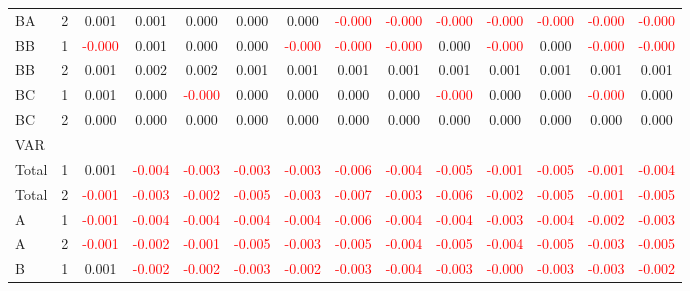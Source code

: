 \begin{table}[!htb]
{\begin{tabular}{llcccccccccccc}
BA & 2 & 0.001 & 0.001 & 0.000 & 0.000 & 0.000 & \textcolor{red}{-0.000} & \textcolor{red}{-0.000} & \textcolor{red}{-0.000} & \textcolor{red}{-0.000} & \textcolor{red}{-0.000} & \textcolor{red}{-0.000} & \textcolor{red}{-0.000}\\
BB & 1 & \textcolor{red}{-0.000} & 0.001 & 0.000 & 0.000 & \textcolor{red}{-0.000} & \textcolor{red}{-0.000} & \textcolor{red}{-0.000} & 0.000 & \textcolor{red}{-0.000} & 0.000 & \textcolor{red}{-0.000} & \textcolor{red}{-0.000}\\
BB & 2 & 0.001 & 0.002 & 0.002 & 0.001 & 0.001 & 0.001 & 0.001 & 0.001 & 0.001 & 0.001 & 0.001 & 0.001\\
BC & 1 & 0.001 & 0.000 & \textcolor{red}{-0.000} & 0.000 & 0.000 & 0.000 & 0.000 & \textcolor{red}{-0.000} & 0.000 & 0.000 & \textcolor{red}{-0.000} & 0.000\\
BC & 2 & 0.000 & 0.000 & 0.000 & 0.000 & 0.000 & 0.000 & 0.000 & 0.000 & 0.000 & 0.000 & 0.000 & 0.000\\
\hline
VAR &  &  &  &  &  &  &  &  &  &  &  &  & \\
\hline
Total & 1 & 0.001 & \textcolor{red}{-0.004} & \textcolor{red}{-0.003} & \textcolor{red}{-0.003} & \textcolor{red}{-0.003} & \textcolor{red}{-0.006} & \textcolor{red}{-0.004} & \textcolor{red}{-0.005} & \textcolor{red}{-0.001} & \textcolor{red}{-0.005} & \textcolor{red}{-0.001} & \textcolor{red}{-0.004}\\
Total & 2 & \textcolor{red}{-0.001} & \textcolor{red}{-0.003} & \textcolor{red}{-0.002} & \textcolor{red}{-0.005} & \textcolor{red}{-0.003} & \textcolor{red}{-0.007} & \textcolor{red}{-0.003} & \textcolor{red}{-0.006} & \textcolor{red}{-0.002} & \textcolor{red}{-0.005} & \textcolor{red}{-0.001} & \textcolor{red}{-0.005}\\
A & 1 & \textcolor{red}{-0.001} & \textcolor{red}{-0.004} & \textcolor{red}{-0.004} & \textcolor{red}{-0.004} & \textcolor{red}{-0.004} & \textcolor{red}{-0.006} & \textcolor{red}{-0.004} & \textcolor{red}{-0.004} & \textcolor{red}{-0.003} & \textcolor{red}{-0.004} & \textcolor{red}{-0.002} & \textcolor{red}{-0.003}\\
A & 2 & \textcolor{red}{-0.001} & \textcolor{red}{-0.002} & \textcolor{red}{-0.001} & \textcolor{red}{-0.005} & \textcolor{red}{-0.003} & \textcolor{red}{-0.005} & \textcolor{red}{-0.004} & \textcolor{red}{-0.005} & \textcolor{red}{-0.004} & \textcolor{red}{-0.005} & \textcolor{red}{-0.003} & \textcolor{red}{-0.005}\\
B & 1 & 0.001 & \textcolor{red}{-0.002} & \textcolor{red}{-0.002} & \textcolor{red}{-0.003} & \textcolor{red}{-0.002} & \textcolor{red}{-0.003} & \textcolor{red}{-0.004} & \textcolor{red}{-0.003} & \textcolor{red}{-0.000} & \textcolor{red}{-0.003} & \textcolor{red}{-0.003} & \textcolor{red}{-0.002}\\

\end{tabular}}
\end{table}
